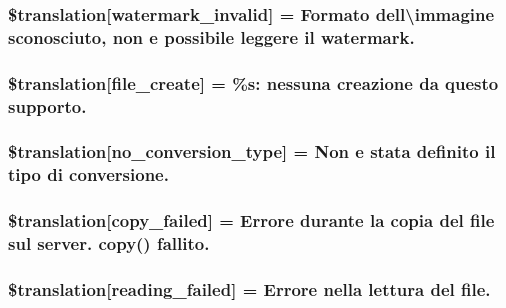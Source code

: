 \subsubsection[{\$translation}]{\setlength{\rightskip}{0pt plus 5cm}\$translation\mbox{[}\textquotesingle{}watermark\+\_\+invalid\textquotesingle{}\mbox{]} = \textquotesingle{}Formato dell\textbackslash{}\textquotesingle{}immagine sconosciuto, non e possibile leggere il watermark.\textquotesingle{}}\label{class_8upload_8it___i_t_8php_ac336e7a5701e47ba4a05e9e498a3cc44}
\hypertarget{class_8upload_8it___i_t_8php_a1ecb4673e4fb69e06b3f20b65cecf30a}{}
\subsubsection[{\$translation}]{\setlength{\rightskip}{0pt plus 5cm}\$translation\mbox{[}\textquotesingle{}file\+\_\+create\textquotesingle{}\mbox{]} = \textquotesingle{}\%s\+: nessuna creazione da questo supporto.\textquotesingle{}}\label{class_8upload_8it___i_t_8php_a1ecb4673e4fb69e06b3f20b65cecf30a}
\hypertarget{class_8upload_8it___i_t_8php_a4712d7ec28e9a7f17eb3338af2358363}{}
\subsubsection[{\$translation}]{\setlength{\rightskip}{0pt plus 5cm}\$translation\mbox{[}\textquotesingle{}no\+\_\+conversion\+\_\+type\textquotesingle{}\mbox{]} = \textquotesingle{}Non e stata definito il tipo di conversione.\textquotesingle{}}\label{class_8upload_8it___i_t_8php_a4712d7ec28e9a7f17eb3338af2358363}
\hypertarget{class_8upload_8it___i_t_8php_a783c9358bcf54a054545b50098bc679b}{}
\subsubsection[{\$translation}]{\setlength{\rightskip}{0pt plus 5cm}\$translation\mbox{[}\textquotesingle{}copy\+\_\+failed\textquotesingle{}\mbox{]} = \textquotesingle{}Errore durante la copia del file sul server. copy() fallito.\textquotesingle{}}\label{class_8upload_8it___i_t_8php_a783c9358bcf54a054545b50098bc679b}
\hypertarget{class_8upload_8it___i_t_8php_a01bea14c9fd5f353f62db44beabfcd42}{}
\subsubsection[{\$translation}]{\setlength{\rightskip}{0pt plus 5cm}\$translation\mbox{[}\textquotesingle{}reading\+\_\+failed\textquotesingle{}\mbox{]} = \textquotesingle{}Errore nella lettura del file.\textquotesingle{}}\label{class_8upload_8it___i_t_8php_a01bea14c9fd5f353f62db44beabfcd42}
